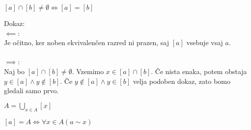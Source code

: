 \begin{trditev}
    $[a] \cap [b] \neq \emptyset \iff [a] = [b]$
\end{trditev}
Dokaz: \\
$\impliedby$: \\
Je očitno, ker noben ekvivalenčen razred ni prazen, saj $[a]$ vsebuje vsaj $a$.\\
\\
$\implies$:\\
Naj bo $[a] \cap [b] \neq \emptyset$.
Vzemimo $x \in [a] \cap [b]$.
Če nista enaka, potem obstaja $y \in [a] \wedge y \notin [b]$.
Če $y \notin [a] \wedge y \in [b]$ velja podoben dokaz, zato bomo gledali samo prvo.

\begin{trditev}
    $A = \bigcup_{x \in A} [x]$
\end{trditev}

\begin{trditev}
    $[a] = A \iff \forall x \in A(a\sim x)$
\end{trditev}



